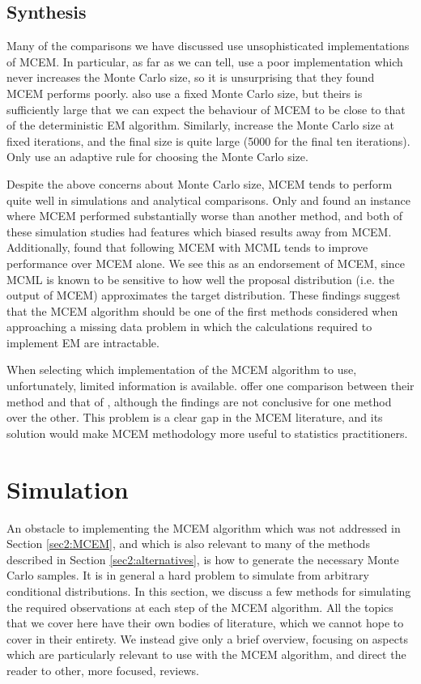 \documentclass[11pt, oneside]{article}   	%
\begin{document}
\subsection{Synthesis}
Many of the comparisons we have discussed \citep{McC97, Gu98I,Jan03} use unsophisticated implementations of MCEM. In particular, as far as we can tell, \citet{Gu98I} use a poor implementation which never increases the Monte Carlo size, so it is unsurprising that they found MCEM performs poorly. \citet{Jan03} also use a fixed Monte Carlo size, but theirs is sufficiently large that we can expect the behaviour of MCEM to be close to that of the deterministic EM algorithm. Similarly, \citet{McC97} increase the Monte Carlo size at fixed iterations, and the final size is quite large (5000 for the final ten iterations). Only \citet{Boo99} use an adaptive rule for choosing the Monte Carlo size.

Despite the above concerns about Monte Carlo size, MCEM tends to perform quite well in simulations and analytical comparisons. Only \citet{Gu98I} and \citet{Boo01} found an instance where MCEM performed substantially worse than another method, and both of these simulation studies had features which biased results away from MCEM. Additionally, \citep{McC97} found that following MCEM with MCML tends to improve performance over MCEM alone. We see this as an endorsement of MCEM, since MCML is known to be sensitive to how well the proposal distribution (i.e. the output of MCEM) approximates the target distribution. These findings suggest that the MCEM algorithm should be one of the first methods considered when approaching a missing data problem in which the calculations required to implement EM are intractable.

When selecting which implementation of the MCEM algorithm to use, unfortunately, limited information is available. \citet{Caf05} offer one comparison between their method and that of \citet{Boo99}, although the findings are not conclusive for one method over the other. This problem is a clear gap in the MCEM literature, and its solution would make MCEM methodology more useful to statistics practitioners.


\section{Simulation}
\label{sec2:simulation}

An obstacle to implementing the MCEM algorithm which was not addressed in Section \ref{sec2:MCEM}, and which is also relevant to many of the methods described in Section \ref{sec2:alternatives}, is how to generate the necessary Monte Carlo samples. It is in general a hard problem to simulate from arbitrary conditional distributions. In this section, we discuss a few methods for simulating the required observations at each step of the MCEM algorithm. All the topics that we cover here have their own bodies of literature, which we cannot hope to cover in their entirety. We instead give only a brief overview, focusing on aspects which are particularly relevant to use with the MCEM algorithm, and direct the reader to other, more focused, reviews.
\end{document}
